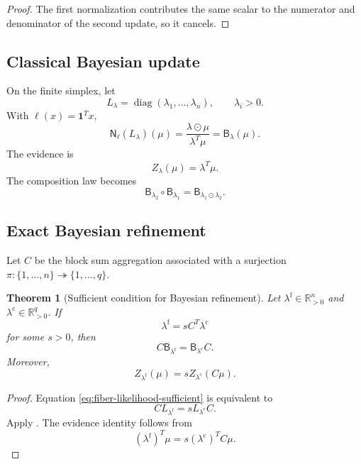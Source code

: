 \documentclass[11pt]{article}
\newtheorem{theorem}{Theorem}[section]
\theoremstyle{definition}
\theoremstyle{remark}
\newcommand{\R}{\mathbb R}
\newcommand{\diag}{\operatorname{diag}}
\newcommand{\fine}{\mathrm f}
\newcommand{\coarse}{\mathrm c}
\newcommand{\Bup}{\mathsf B}
\newcommand{\Nrm}{\mathsf N}
\newcommand{\one}{\mathbf 1}
\begin{document}
\begin{proof}
The first normalization contributes the same scalar to the numerator and denominator of the second update, so it cancels.
\end{proof}

\subsection{Classical Bayesian update}
On the finite simplex, let
\[
  L_{\lambda}=\diag(\lambda_1,\ldots,\lambda_n),
  \qquad
  \lambda_i>0.
\]
With $\ell(x)=\one^Tx$,
\[
  \Nrm_{\ell}(L_{\lambda})(\mu)
  =
  \frac{\lambda\odot\mu}{\lambda^T\mu}
  =\Bup_{\lambda}(\mu).
\]
The evidence is
\[
  Z_{\lambda}(\mu)=\lambda^T\mu.
\]
The composition law becomes
\begin{equation}\label{eq:bayes-composition}
  \Bup_{\lambda_2}\circ\Bup_{\lambda_1}
  =
  \Bup_{\lambda_1\odot\lambda_2}.
\end{equation}

\subsection{Exact Bayesian refinement}
Let $C$ be the block sum aggregation associated with a surjection $\pi:\{1,\ldots,n\}\twoheadrightarrow\{1,\ldots,q\}$.

\begin{theorem}[Sufficient condition for Bayesian refinement]\label{thm:bayes-sufficient}
Let $\lambda^{\fine}\in\R_{>0}^n$ and $\lambda^{\coarse}\in\R_{>0}^q$.  If
\begin{equation}\label{eq:fiber-likelihood-sufficient}
  \lambda^{\fine}=sC^T\lambda^{\coarse}
\end{equation}
for some $s>0$, then
\begin{equation}\label{eq:exact-bayes-refinement}
  \boxed{
  C\Bup_{\lambda^{\fine}}
  =
  \Bup_{\lambda^{\coarse}}C.}
\end{equation}
Moreover,
\begin{equation}\label{eq:evidence-scaling}
  Z_{\lambda^{\fine}}(\mu)
  =
  sZ_{\lambda^{\coarse}}(C\mu).
\end{equation}
\end{theorem}

\begin{proof}
Equation \eqref{eq:fiber-likelihood-sufficient} is equivalent to
\[
  CL_{\lambda^{\fine}}
  =sL_{\lambda^{\coarse}}C.
\]
Apply .  The evidence identity follows from
\[
  (\lambda^{\fine})^T\mu
  =s(\lambda^{\coarse})^TC\mu.
\]
\end{proof}
\end{document}
